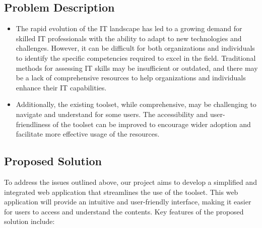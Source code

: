 \subsection{Problem Description}
\begin{itemize}
    \renewcommand\labelitemi{-}
    \item The rapid evolution of the IT landscape has led to a growing demand for skilled IT professionals with the ability to adapt to new technologies and challenges. However, it can be difficult for both organizations and individuals to identify the specific competencies required to excel in the field. Traditional methods for assessing IT skills may be insufficient or outdated, and there may be a lack of comprehensive resources to help organizations and individuals enhance their IT capabilities.
          
    \item Additionally, the existing  toolset, while comprehensive, may be challenging to navigate and understand for some users. The accessibility and user-friendliness of the toolset can be improved to encourage wider adoption and facilitate more effective usage of the  resources.
\end{itemize}



\subsection{Proposed Solution}
To address the issues outlined above, our project aims to develop a simplified and integrated web application that streamlines the use of the  toolset. This web application will provide an intuitive and user-friendly interface, making it easier for users to access and understand the  contents. Key features of the proposed solution include:

